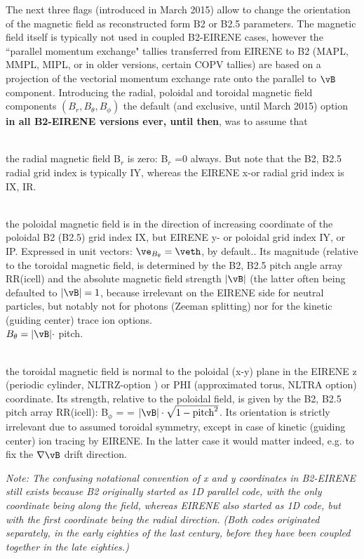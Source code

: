 \medskip
The next three flags (introduced in March 2015) allow to change the orientation of the magnetic
field as reconstructed form B2 or B2.5 parameters. The magnetic field itself is typically not used
in coupled B2-EIRENE cases, however the ``parallel momentum exchange" tallies transferred from
EIRENE to B2 (MAPL, MMPL, MIPL, or in older versions, certain COPV tallies) are based on
a projection of the vectorial momentum exchange rate onto the parallel to $\vB$ component.
Introducing the radial, poloidal and toroidal magnetic field components $(B_r,B_\theta,B_\phi)$
the default (and exclusive, until March 2015) option \textbf{in all B2-EIRENE versions ever, until then}, was to assume that\\
\begin{list}{ }{}
\item[B\bf{$_r$ =$(\vB \cdot \ver)$}] { \ }\\
the radial magnetic field B$_r$ is zero: B$_r$ =0 always. But note that the B2, B2.5 radial grid index is typically IY,
whereas the EIRENE x-or radial grid index is IX, IR.

\item[B{\bf $_\theta$ =$(\vB \cdot \veth)$}] { \ }\\
the poloidal magnetic field is in the direction of increasing coordinate of the poloidal B2 (B2.5) grid index IX,
but EIRENE y- or poloidal grid index IY, or IP. Expressed in unit vectors: $\ve_{B_\theta} = \veth$, by default..
Its magnitude (relative to the toroidal magnetic field, is determined by the B2, B2.5 pitch angle array RR(icell)
and the absolute magnetic field strength $|\vB|$ (the latter often being defaulted to $|\vB|=1$, because irrelevant on the EIRENE side for neutral particles,
but notably not for photons (Zeeman splitting) nor for the kinetic (guiding center) trace ion options.\\
$B_\theta = |\vB| \cdot $ pitch.

\item[B{\bf $_\phi$ =$(\vB \cdot \veph$)}] { \ }\\
the toroidal magnetic field is normal to the poloidal (x-y) plane in the EIRENE z (periodic cylinder, NLTRZ-option )
or PHI (approximated torus, NLTRA option)
coordinate. Its strength, relative to the poloidal field, is given by the B2, B2.5 pitch array RR(icell):
B$_\phi$ = = $|\vB| \cdot \sqrt{1-\mbox{pitch}^2}$.
Its orientation is strictly irrelevant due to assumed toroidal symmetry, except in case of kinetic (guiding center) ion tracing by EIRENE.
In the latter case it would matter indeed, e.g. to fix the $\nabla \vB$ drift direction.\\
\end{list}
\emph{Note: The confusing notational convention of x and y coordinates in B2-EIRENE still exists because B2 originally started as 1D parallel
code, with the only coordinate being along the field, whereas EIRENE also started as 1D code,
but with the first coordinate being the radial direction. (Both codes originated separately, in the early eighties of the last century, before they have been
coupled together in the late eighties.)}

